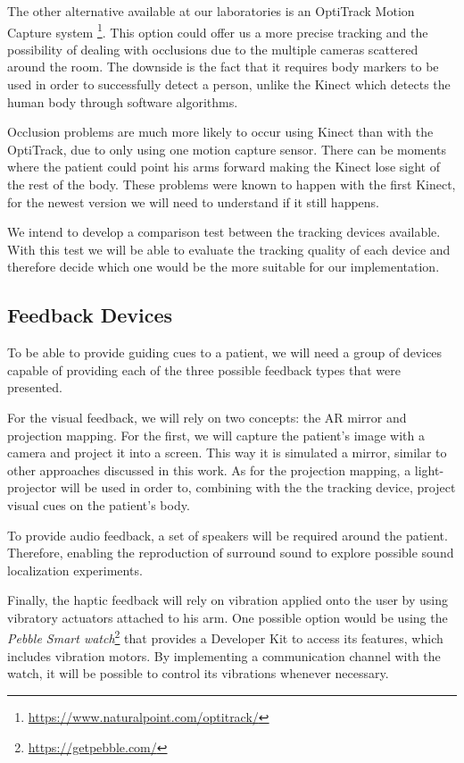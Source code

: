 The other alternative available at our laboratories is an OptiTrack Motion Capture system \footnote{\url{https://www.naturalpoint.com/optitrack/}}. 
This option could offer us a more precise tracking and the possibility of dealing with occlusions due to the multiple cameras scattered around the room. The downside is the fact that 
it requires body markers to be used in order to successfully detect a person, unlike the 
Kinect which detects the human body through software algorithms.

Occlusion problems are much more likely to occur using Kinect than with the OptiTrack, due to only using one motion capture sensor. There can be moments where the patient could point his arms forward making the Kinect lose sight of the rest of the body. These problems were known to happen with the first Kinect, for the newest version we will need to understand if it still happens.

We intend to develop a comparison test between the tracking devices available. With this test we will be able to evaluate the tracking quality of each device and therefore decide which one would be the more suitable for our implementation. 

\subsection{Feedback Devices}

To be able to provide guiding cues to a patient, we will need a group of devices capable of providing each of the three possible feedback types that were presented.

For the visual feedback, we will rely on two concepts: the \ac{AR} mirror and projection mapping. 
For the first, we will capture the patient's image with a camera and project it into a screen. 
This way it is simulated a mirror, similar to other approaches discussed in this work.
As for the projection mapping, a light-projector will be used in order to, combining with 
the the tracking device, project visual cues on the patient's body.

To provide audio feedback, a set of speakers will be required around the patient. 
Therefore, enabling the reproduction of surround sound to explore possible sound localization experiments.

Finally, the haptic feedback will rely on vibration applied onto the user by using 
vibratory actuators attached to his arm. 
One possible option would be using the \textit{Pebble Smart watch}\footnote{\url{https://getpebble.com/}} that 
provides a Developer Kit to access its features, which includes vibration motors. 
By implementing a communication channel with the watch, it will be possible to control its vibrations whenever necessary.

